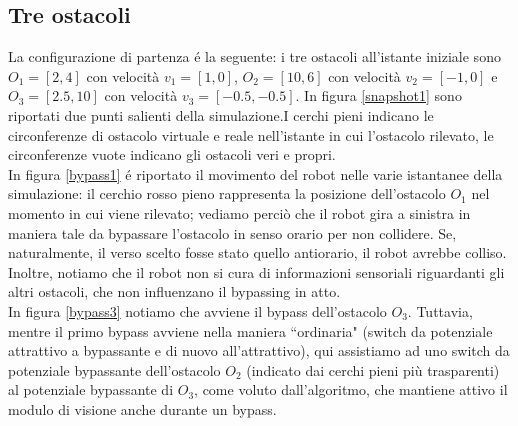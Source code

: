 \documentclass[14pt,a4paper]{extarticle}
\begin{document}
\subsection{Tre ostacoli}
La configurazione di partenza é la seguente: i tre ostacoli all'istante iniziale sono \(O_1=[2,4]\) con velocità \(v_1=[1,0]\), \(O_2=[10,6]\) con velocità \(v_2=[-1,0]\) e \(O_3=[2.5,10]\) con velocità \(v_3=[-0.5,-0.5]\). In figura \ref{snapshot1} sono riportati due punti salienti della simulazione.I cerchi pieni indicano le circonferenze di ostacolo virtuale e reale nell'istante in cui l'ostacolo rilevato, le circonferenze vuote indicano gli ostacoli veri e propri.\\
In figura \ref{bypass1} é riportato il movimento del robot nelle varie istantanee della simulazione: il cerchio rosso pieno rappresenta la posizione dell'ostacolo \(O_1\) nel momento in cui viene rilevato; vediamo perciò che il robot gira a sinistra in maniera tale da bypassare l'ostacolo in senso orario per non collidere. Se, naturalmente, il verso scelto fosse stato quello antiorario, il robot avrebbe colliso. Inoltre, notiamo che il robot non si cura di informazioni sensoriali riguardanti gli altri ostacoli, che non influenzano il bypassing in atto.\\
In figura \ref{bypass3} notiamo che avviene il bypass dell'ostacolo \(O_3\). Tuttavia, mentre il primo bypass avviene nella maniera ``ordinaria" (switch da potenziale attrattivo a bypassante e di nuovo all'attrattivo), qui assistiamo ad uno switch da potenziale bypassante dell'ostacolo \(O_2\) (indicato dai cerchi pieni più trasparenti) al potenziale bypassante di \(O_3\), come voluto dall'algoritmo, che mantiene attivo il modulo di visione anche durante un bypass.
\end{document}
